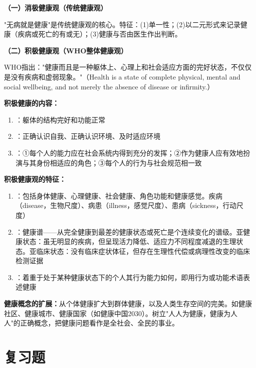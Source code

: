 \begin{keybox}
\textbf{（一）消极健康观（传统健康观）}

"无病就是健康"是传统健康观的核心。特征：(1)单一性；(2)以二元形式来记录健康（疾病或死亡的有或无）；(3)健康与否由医生作出判断。

\textbf{（二）积极健康观（WHO整体健康观）}

WHO指出："健康而且是一种躯体上、心理上和社会适应方面的完好状态，不仅仅是没有疾病和虚弱现象。"（Health is a state of complete physical, mental and social wellbeing, and not merely the absence of disease or infirmity.）

\textbf{积极健康的内容：}
\begin{enumerate}[leftmargin=*]
    \item {}：躯体的结构完好和功能正常
    \item {}：正确认识自我、正确认识环境、及时适应环境
    \item {}：①每个人的能力应在社会系统内得到充分的发挥；②作为健康人应有效地扮演与其身份相适应的角色；③每个人的行为与社会规范相一致
\end{enumerate}

\textbf{积极健康观的特征：}
\begin{enumerate}[leftmargin=*]
    \item {}：包括身体健康、心理健康、社会健康、角色功能和健康感觉。疾病（disease，生物尺度）、病患（illness，感觉尺度）、患病（sickness，行动尺度）
    \item {}：健康谱——从完全健康到最差的健康状态或死亡是个连续变化的谱级。亚健康状态：虽无明显的疾病，但呈现活力降低、适应力不同程度减退的生理状态。亚临床状态：没有临床症状体征，但存在生理性代偿或病理性改变的临床检测证据
    \item {}：着重于处于某种健康状态下的个人其行为能力如何，即用行为或功能术语表述健康
\end{enumerate}

\textbf{健康概念的扩展：}从个体健康扩大到群体健康，以及人类生存空间的完美。如健康社区、健康城市、健康国家（如健康中国2030）。树立"人人为健康，健康为人人"的正确概念，把健康问题看作是全社会、全民的事业。
\end{keybox}

\section{复习题}

